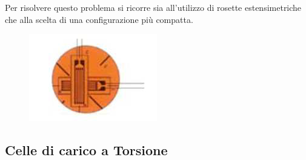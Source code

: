 \documentclass[a4paper, 15pt]{article}
\newcommand{\xmark}{\ding{55}}
\begin{document}
\begin{adjustwidth}{2in}{}
\begin{itemize}[label=\textcolor{red}{\xmark}]
 			Per risolvere questo problema si ricorre sia all'utilizzo di rosette estensimetriche che alla scelta di una configurazione più compatta. 			
 			\begin{figure}[H]
 				\centering
 				\includegraphics[width=0.3\linewidth]{immagini/screenshot007}
 				\label{fig:screenshot007}
 			\end{figure}		 
 		\end{itemize}
\end{adjustwidth}
\subsection{Celle di carico a Torsione}		
\end{document}
